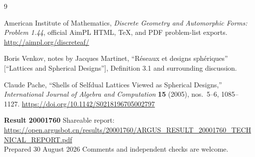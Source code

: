 \documentclass[11pt]{article}
\newcommand{\reporturl}{\url{https://open.argusbot.cn/results/20001760/ARGUS_RESULT_20001760_TECHNICAL_REPORT.pdf}}
\theoremstyle{argusplain}
\begin{document}
{}
\small
\begin{thebibliography}{9}
\setlength{\itemsep}{2pt}

American Institute of Mathematics,
\emph{Discrete Geometry and Automorphic Forms: Problem 1.44},
official AimPL HTML, TeX, and PDF problem-list exports.
\url{http://aimpl.org/discreteaf/}

Boris Venkov, notes by Jacques Martinet,
``Réseaux et designs sphériques'' [``Lattices and Spherical Designs''],
Definition 3.1 and surrounding discussion.

Claude Pache,
``Shells of Selfdual Lattices Viewed as Spherical Designs,''
\emph{International Journal of Algebra and Computation} \textbf{15} (2005), nos.~5--6, 1085--1127.
\url{https://doi.org/10.1142/S0218196705002797}

\end{thebibliography}

\vfill
\begin{notebox}
\centering\sffamily\small
\textbf{Result 20001760} \enspace\textbullet\enspace Shareable report: \reporturl\\
Prepared 30 August 2026 \enspace\textbullet\enspace Comments and independent checks are welcome.
\end{notebox}
\end{document}
